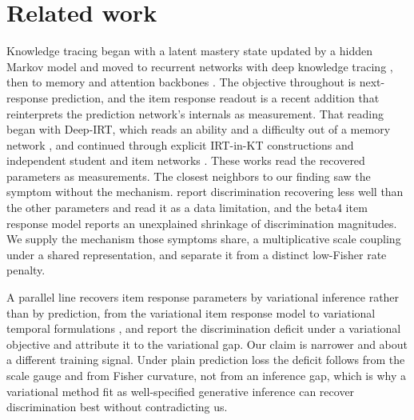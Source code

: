 \documentclass[sigconf,nonacm,screen]{acmart}
\begin{document}
\section{Related work}
Knowledge tracing began with a latent mastery state updated by a hidden Markov
model \cite{corbett_knowledge_1994} and moved to recurrent networks with deep
knowledge tracing \cite{piech_deep_2015}, then to memory and attention backbones
\cite{zhang_dynamic_2017,pandey_self-attentive_2019,ghosh_context-aware_2020}. The
objective throughout is next-response prediction, and the item response readout is a
recent addition that reinterprets the prediction network's internals as measurement.
That reading began with Deep-IRT, which reads an ability and a difficulty out of a
memory network \cite{yeung_deep-irt_2019,zhang_dynamic_2017}, and continued through
explicit IRT-in-KT constructions \cite{converse_irt_kt_2021} and independent student
and item networks \cite{tsutsumi_state_2023,tsutsumi_deep_2024}. These works read the
recovered parameters as measurements. The closest neighbors to our finding saw the
symptom without the mechanism. \citet{converse_irt_kt_2021} report discrimination
recovering less well than the other parameters and read it as a data limitation,
and the beta4 item response model \cite{beta4irt_2023} reports an unexplained
shrinkage of discrimination magnitudes. We supply the mechanism those symptoms
share, a multiplicative scale coupling under a shared representation, and separate
it from a distinct low-Fisher rate penalty.

A parallel line recovers item response parameters by variational inference rather
than by prediction, from the variational item response model
\cite{wu_variational_2020} to variational temporal formulations \cite{vtirt_2023},
and \citet{ma_neural_2024} report the discrimination deficit under a variational
objective and attribute it to the variational gap. Our claim is narrower and about
a different training signal. Under plain prediction loss the deficit follows from
the scale gauge and from Fisher curvature, not from an inference gap, which is why
a variational method fit as well-specified generative inference can recover
discrimination best without contradicting us.
\end{document}
